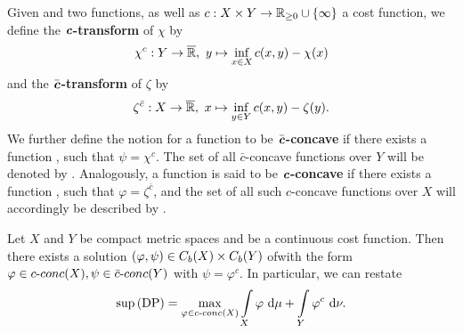\begin{definition}\label{cTrafo}
	Given  and  two functions, as well as $\map[c]{X \times Y}{\RZero{} \cup{} \{ \infty \}}$ a cost function, we define the \textbf{$\text{\textbf{\textit{c}}}$-transform} of $\chi$ by
	\[ \map[\chi^c]{Y}{\Rbar},~y \mapsto \inf\limits_{x \in X} c(x, y) - \chi(x) \]
	and the \textbf{$\bar{\text{\textbf{\textit{c}}}}$-transform} of $\zeta$ by
	\[ \map[\zeta^{\bar{c}}]{X}{\Rbar},~x \mapsto \inf\limits_{y \in Y} c(x, y) - \zeta(y). \]
	We further define the notion for a function  to be \textbf{$\bar{\text{\textbf{\textit{c}}}}$-concave} if there exists a function , such that $\psi = \chi^c$. The set of all $\bar{c}$-concave functions over $Y$ will be denoted by . Analogously, a function  is said to be \textbf{$\text{\textbf{\textit{c}}}$-concave} if there exists a function , such that $\varphi = \zeta^{\bar{c}}$, and the set of all such $c$-concave functions over $X$ will accordingly be described by .
\end{definition}

\begin{theorem}\label{DPSolExist}
	Let $X$ and $Y$ be compact metric spaces and  be a continuous cost function. Then there exists a solution $(\varphi,\psi) \in \CF[b]{X} \times \CF[b]{Y}$ ofwith the form $\varphi \in \CConc{X}, \psi \in \CBConc{Y}$ with $\psi = \varphi^c$. In particular, we can restate
	\[ \sup\!\text{\normalfont\,(DP)} = \max\limits_{\varphi \in \CConc{X}} \int\limits_X \varphi~\D + \int\limits_Y \varphi^c~\D[\nu]. \]
\end{theorem}

